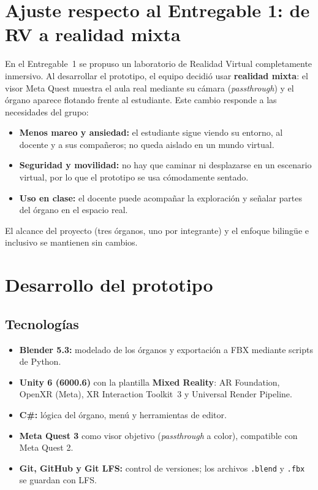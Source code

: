 \documentclass[11pt,a4paper]{article}
\begin{document}
\section{Ajuste respecto al Entregable 1: de RV a realidad mixta}
En el Entregable~1 se propuso un laboratorio de Realidad Virtual completamente inmersivo. Al desarrollar el prototipo, el equipo decidió usar \textbf{realidad mixta}: el visor Meta Quest muestra el aula real mediante su cámara (\emph{passthrough}) y el órgano aparece flotando frente al estudiante. Este cambio responde a las necesidades del grupo:
\begin{itemize}
    \item \textbf{Menos mareo y ansiedad:} el estudiante sigue viendo su entorno, al docente y a sus compañeros; no queda aislado en un mundo virtual.
    \item \textbf{Seguridad y movilidad:} no hay que caminar ni desplazarse en un escenario virtual, por lo que el prototipo se usa cómodamente sentado.
    \item \textbf{Uso en clase:} el docente puede acompañar la exploración y señalar partes del órgano en el espacio real.
\end{itemize}
El alcance del proyecto (tres órganos, uno por integrante) y el enfoque bilingüe e inclusivo se mantienen sin cambios.

\section{Desarrollo del prototipo}
\subsection{Tecnologías}
\begin{itemize}
    \item \textbf{Blender 5.3:} modelado de los órganos y exportación a FBX mediante scripts de Python.
    \item \textbf{Unity 6 (6000.6)} con la plantilla \textbf{Mixed Reality}: AR Foundation, OpenXR (Meta), XR Interaction Toolkit~3 y Universal Render Pipeline.
    \item \textbf{C\#:} lógica del órgano, menú y herramientas de editor.
    \item \textbf{Meta Quest 3} como visor objetivo (\emph{passthrough} a color), compatible con Meta Quest 2.
    \item \textbf{Git, GitHub y Git LFS:} control de versiones; los archivos \texttt{.blend} y \texttt{.fbx} se guardan con LFS.
\end{itemize}
\end{document}
